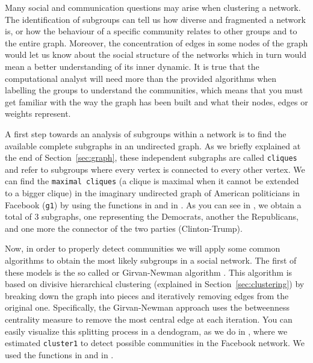 Many social and communication questions may arise when clustering a network. The identification of subgroups can tell us how diverse and fragmented a network is, or how the behaviour of a specific community relates to other groups and to the entire graph. Moreover, the concentration of edges in some nodes of the graph would let us know about the social structure of the networks which in turn would mean a better understanding of its inner dynamic.  It is true that the computational analyst will need more than the provided algorithms when labelling the groups to understand the communities, which means that you must get familiar with the way the graph has been built and what their nodes, edges or weights represent.

A first step towards an analysis of subgroups within a network is to find the available complete subgraphs in an undirected graph. As we briefly explained at the end of Section~\ref{sec:graph}, these independent subgraphs are called \texttt{cliques} and refer to subgroups where every vertex is connected to every other vertex. We can find the \texttt{maximal cliques} (a clique is maximal when it cannot be extended to a  bigger clique) in the imaginary undirected graph of American politicians in Facebook (\texttt{g1}) by using the functions  in  \citep{eppstein2010listing} and  in  \citep{cazals2008note}. As you can see in , we obtain a total of 3 subgraphs, one representing the Democrats, another the Republicans, and one more the connector of the two parties (Clinton-Trump).


Now, in order to properly detect communities we will apply some common algorithms to obtain the most likely subgroups in a social network. The first of these models is the so called  or Girvan-Newman algorithm \citep{newman2004finding}. This algorithm is based on divisive hierarchical clustering (explained in Section~\ref{sec:clustering}) by breaking down the graph into pieces and iteratively removing edges from the original one. Specifically,  the Girvan-Newman approach uses the betweenness centrality measure to remove the most central edge at each iteration. You can easily visualize this splitting process in a dendogram, as we do in , where we estimated \texttt{cluster1} to detect possible communities in the Facebook network. We used the functions  in  and  in .


